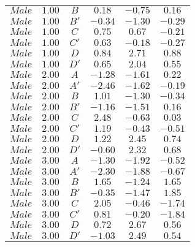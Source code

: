 \begin{tabular}{cccccc}
$Male$ & $1.00$ & $B$ & $0.18$ & $-0.75$ & $0.16$\\
$Male$ & $1.00$ & $B'$ & $-0.34$ & $-1.30$ & $-0.29$\\
$Male$ & $1.00$ & $C$ & $0.75$ & $0.67$ & $-0.21$\\
$Male$ & $1.00$ & $C'$ & $0.63$ & $-0.18$ & $-0.27$\\
$Male$ & $1.00$ & $D$ & $0.84$ & $2.71$ & $0.88$\\
$Male$ & $1.00$ & $D'$ & $0.65$ & $2.04$ & $0.55$\\
$Male$ & $2.00$ & $A$ & $-1.28$ & $-1.61$ & $0.22$\\
$Male$ & $2.00$ & $A'$ & $-2.46$ & $-1.62$ & $-0.19$\\
$Male$ & $2.00$ & $B$ & $1.01$ & $-1.30$ & $-0.34$\\
$Male$ & $2.00$ & $B'$ & $-1.16$ & $-1.51$ & $0.16$\\
$Male$ & $2.00$ & $C$ & $2.48$ & $-0.63$ & $0.03$\\
$Male$ & $2.00$ & $C'$ & $1.19$ & $-0.43$ & $-0.51$\\
$Male$ & $2.00$ & $D$ & $1.22$ & $2.45$ & $0.74$\\
$Male$ & $2.00$ & $D'$ & $-0.60$ & $2.32$ & $0.68$\\
$Male$ & $3.00$ & $A$ & $-1.30$ & $-1.92$ & $-0.52$\\
$Male$ & $3.00$ & $A'$ & $-2.30$ & $-1.88$ & $-0.67$\\
$Male$ & $3.00$ & $B$ & $1.65$ & $-1.24$ & $1.65$\\
$Male$ & $3.00$ & $B'$ & $-0.35$ & $-1.47$ & $1.85$\\
$Male$ & $3.00$ & $C$ & $2.05$ & $-0.46$ & $-1.74$\\
$Male$ & $3.00$ & $C'$ & $0.81$ & $-0.20$ & $-1.84$\\
$Male$ & $3.00$ & $D$ & $0.72$ & $2.67$ & $0.56$\\
$Male$ & $3.00$ & $D'$ & $-1.03$ & $2.49$ & $0.54$\\
\end{tabular}
